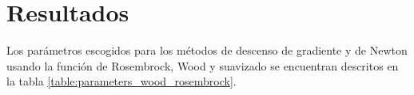 \section{Resultados}

Los parámetros escogidos para los métodos de descenso de gradiente y de Newton usando la función de Rosembrock, Wood y suavizado se encuentran descritos en la tabla \ref{table:parameters_wood_rosembrock}.







